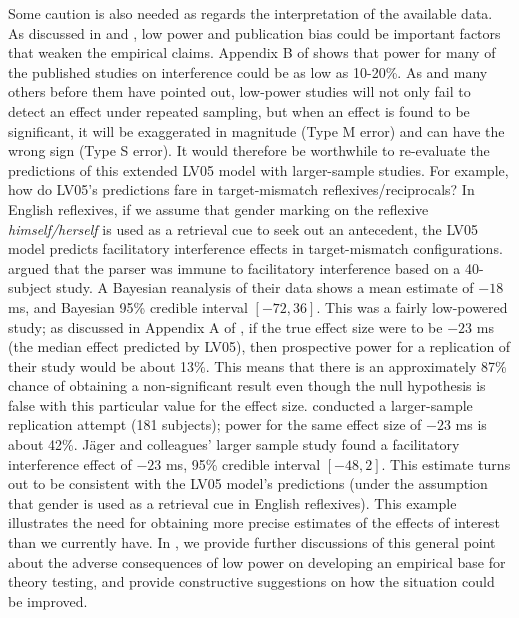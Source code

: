 \documentclass{cambridge7A}\usepackage[]{graphicx}\usepackage[]{color}
\newcommand{\revisedII}[1]{#1}
\begin{document}
\revisedII{Some caution is also needed as regards the interpretation of the available data.} 
As discussed in \cite{JaegerEngelmannVasishth2017} and \cite{VasishthMertzenJaegerGelman2018}, low power and publication bias could be important factors that weaken the empirical claims. Appendix B of \cite{JaegerEngelmannVasishth2017} shows that power for many of the published studies on interference could be as low as 10-20\%. As \cite{GelmanCarlin2014} and many others before them have pointed out, low-power studies will not only fail to detect an effect under repeated sampling, but when an effect is found to be significant, it will be exaggerated in magnitude (Type M error) and can have the wrong sign (Type S error). It would therefore be worthwhile to re-evaluate the predictions of this extended LV05 model with larger-sample studies. 
\revisedII{For example, how do LV05's predictions fare in target-mismatch reflexives/reciprocals? In English reflexives, if we assume that gender marking on the reflexive \textit{himself/herself} is used as a retrieval cue to seek out an antecedent, the LV05 model predicts facilitatory interference effects in target-mismatch configurations. 
\cite{DillonMishlerSloggett2013} argued that the parser was immune to facilitatory interference based on a 40-subject study. A Bayesian reanalysis of their data \citep{JaegerMertzenVanDykeVasishth2019} shows a mean estimate of $-18$ ms, and Bayesian 95\% credible interval $[-72,36]$. This was a fairly low-powered study; as discussed in Appendix A of  \cite{JaegerMertzenVanDykeVasishth2019}, if the true effect size were to be $-23$ ms (the median effect predicted by LV05), then prospective power for a replication of their study would be about 13\%. This means that there is an approximately 87\% chance of obtaining a non-significant result even though the null hypothesis is false with this particular value for the effect size.
\cite{JaegerMertzenVanDykeVasishth2019} conducted a larger-sample replication attempt (181 subjects); power for the same effect size of $-23$ ms is about 42\%.
J\"ager and colleagues' larger sample study found a facilitatory interference effect of $-23$ ms, 95\% credible interval $[-48,2]$. This estimate turns out to be consistent with the LV05 model's predictions (under the assumption that gender is used as a retrieval cue in English reflexives). This example illustrates the need for obtaining more precise estimates of the effects of interest than we currently have. In \cite{VasishthMertzenJaegerGelman2018}, we provide further discussions of this general point about the adverse consequences of low power on developing an empirical base for theory testing, and provide constructive suggestions on how the situation could be improved.}
\end{document}
